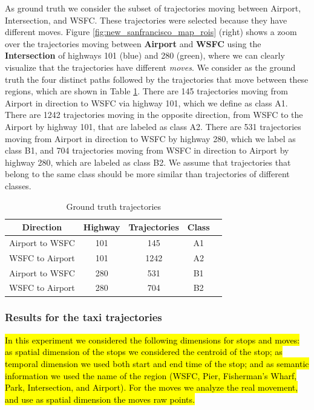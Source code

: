 \documentclass[12pt]{article}
\begin{document}
As ground truth we consider the subset of trajectories moving between Airport,  Intersection, and WSFC. These trajectories were selected because they have different moves.  Figure {\ref{fig:new_sanfrancisco_map_rois}} (right) shows a zoom over the trajectories moving between  \textbf{Airport} and \textbf{WSFC}  using the \textbf{Intersection} of highways 101 (blue) and 280 (green), where we can clearly visualize that the trajectories have different \emph{moves}. We consider as the ground truth the four distinct paths followed by the trajectories that move between these regions, which are shown in Table {\ref{tab:new_san_francisco_dataset}}. There are 145 trajectories moving from Airport in direction to WSFC via highway 101, which we define as class A1. There are 1242 trajectories moving in the opposite direction, from WSFC to the Airport by highway 101, that are labeled as class A2. There are 531 trajectories moving from Airport in direction to WSFC by highway 280, which we label as class B1, and 704 trajectories moving from WSFC in direction to Airport by highway 280, which are labeled as class B2. We assume that trajectories that belong to the same class should be more similar than trajectories of different classes.

\begin{table}[h]
\scriptsize
  \centering
  \begin{tabular}{|c|c|c|c|c|}
  	\hline
 Direction & Highway & Trajectories & Class \\
  	\hline
 Airport to WSFC & 101 & 145 & A1\\
 WSFC to Airport & 101 & 1242 & A2\\
 Airport to WSFC & 280 & 531 & B1\\
 WSFC to Airport & 280 & 704 & B2\\
    \hline
  \end{tabular}
  \caption{Ground truth trajectories}
  \label{tab:new_san_francisco_dataset}
\end{table}

\subsubsection{Results for the taxi trajectories}

\hl{In this experiment we considered the following dimensions for stops and moves: as spatial dimension of the stops we considered the centroid of the stop; as temporal dimension we used both start and end time of the stop; and as semantic information we used the name of the region (WSFC, Pier, Fisherman's Wharf, Park, Intersection, and Airport). For the moves we analyze the real movement, and use as spatial dimension the moves raw points.}
\end{document}
